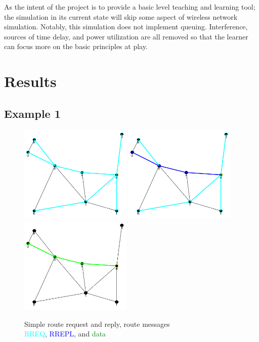 \documentclass[conference]{IEEEtran}
\begin{document}
As the intent of the project is to provide a basic level teaching and learning tool; the simulation in its current state will skip some aspect of wireless network simulation. Notably, this simulation does not implement queuing. Interference, sources of time delay, and power utilization are all removed so that the learner can focus more on the basic principles at play.

\section{Results}

\subsection{Example 1}

\begin{figure}[ht]
	\centering
	\includegraphics[width=2.1in]{Ex_1_request.png}
	\includegraphics[width=2.1in]{Ex_1_reply.png}
	\includegraphics[width=2.1in]{Ex_1_data.png}
	\caption{Simple route request and reply, route messages \\
			\textcolor{cyan}{RREQ}, \textcolor{blue}{RREPL}, and \textcolor{green}{data} }
	\label{fig:ex_1}
\end{figure}
\end{document}
